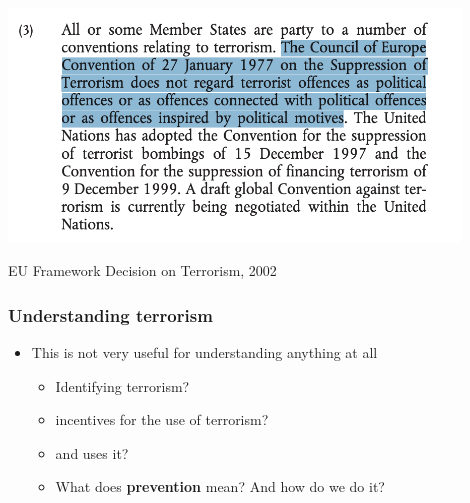 \documentclass[aspectratio=43]{beamer}
\begin{document}


\begin{frame}
\frametitle{}
\centering

\includegraphics[width = 0.9\textwidth]{img/eu_law}

EU Framework Decision on Terrorism, 2002

\end{frame}

\begin{frame}
\frametitle{Understanding terrorism}
\centering

\begin{itemize}
  \item[] This is not very useful for understanding anything at all
  \begin{itemize}
    \item<2-> Identifying terrorism?
    \item<3->  incentives for the use of terrorism?
    \item<4-> {\color{red}{Who}} and {\color{red}{when}} uses it?
    \item<5-> What does \textbf{prevention} mean? And how do we do it?
  \end{itemize}
\end{itemize}

\end{frame}
\end{document}
